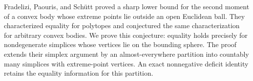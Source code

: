 Fradelizi, Paouris, and Sch\"utt proved a sharp lower bound for the second
moment of a convex body whose extreme points lie outside an open Euclidean
ball. They characterized equality for polytopes and conjectured the same
characterization for arbitrary convex bodies. We prove this conjecture:
equality holds precisely for nondegenerate simplices whose vertices lie on
the bounding sphere. The proof extends their simplex argument by an
almost-everywhere partition into countably many simplices with extreme-point
vertices. An exact nonnegative deficit identity retains the equality
information for this partition.
